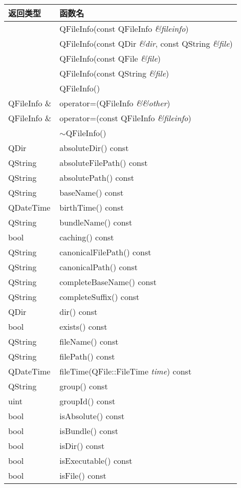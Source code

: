 \begin{longtable}{|l|l|}
\hline
返回类型& 	函数名\\
\hline
&	QFileInfo(const QFileInfo \emph{\&fileinfo})\\
\hline
&	QFileInfo(const QDir \emph{\&dir}, const QString \emph{\&file})\\
\hline
&	QFileInfo(const QFile \emph{\&file})\\
\hline
&	QFileInfo(const QString \emph{\&file})\\
\hline
&	QFileInfo()\\
\hline
QFileInfo \& &	operator=(QFileInfo \emph{\&\&other})\\
\hline
QFileInfo \& &	operator=(const QFileInfo \emph{\&fileinfo})\\
\hline
&	$\sim$QFileInfo()\\
\hline
QDir& 	absoluteDir() const\\
\hline
QString& 	absoluteFilePath() const\\
\hline
QString& 	absolutePath() const\\
\hline
QString& 	baseName() const\\
\hline
QDateTime& 	birthTime() const\\
\hline
QString& 	bundleName() const\\
\hline
bool& 	caching() const\\
\hline
QString& 	canonicalFilePath() const\\
\hline
QString& 	canonicalPath() const\\
\hline
QString& 	completeBaseName() const\\
\hline
QString& 	completeSuffix() const\\
\hline
QDir& 	dir() const\\
\hline
bool& 	exists() const\\
\hline
QString& 	fileName() const\\
\hline
QString& 	filePath() const\\
\hline
QDateTime& 	fileTime(QFile::FileTime \emph{time}) const\\
\hline
QString& 	group() const\\
\hline
uint& 	groupId() const\\
\hline
bool& 	isAbsolute() const\\
\hline
bool& 	isBundle() const\\
\hline
bool& 	isDir() const\\
\hline
bool& 	isExecutable() const\\
\hline
bool& 	isFile() const\\

\end{longtable}
